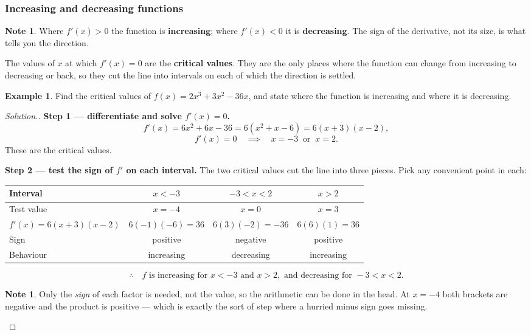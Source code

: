 \documentclass[11pt,a4paper]{article}
\theoremstyle{definition}
\newtheorem{example}[thm]{Example}
\newtheorem{note}[thm]{Note}
\newenvironment{solution}
  {\renewcommand{\qedsymbol}{}\begin{proof}[\textit{Solution}.]}
  {\end{proof}}
\begin{document}
\subsubsection{Increasing and decreasing functions}

\begin{note}
Where $f'(x)>0$ the function is \textbf{increasing}; where $f'(x)<0$ it is
\textbf{decreasing}. The sign of the derivative, not its size, is what tells you the
direction.
\end{note}

The values of $x$ at which $f'(x)=0$ are the \textbf{critical values}. They are the only
places where the function can change from increasing to decreasing or back, so they cut
the line into intervals on each of which the direction is settled.

\begin{example}
Find the critical values of $f(x)=2x^3+3x^2-36x$, and state where the function is
increasing and where it is decreasing.
\end{example}

\begin{solution}
\textbf{Step 1 --- differentiate and solve $f'(x)=0$.}
$$f'(x)=6x^2+6x-36=6\left(x^2+x-6\right)=6(x+3)(x-2),$$
$$f'(x)=0\quad\implies\quad x=-3\ \text{ or }\ x=2.$$
These are the critical values.

\textbf{Step 2 --- test the sign of $f'$ on each interval.} The two critical values cut
the line into three pieces. Pick any convenient point in each:

\begin{table}[H]
\centering
\begin{tabular}{|l|c|c|c|}
\hline
Interval & $x<-3$ & $-3<x<2$ & $x>2$\\
\hline
Test value & $x=-4$ & $x=0$ & $x=3$\\
$f'(x)=6(x+3)(x-2)$ & $6(-1)(-6)=36$ & $6(3)(-2)=-36$ & $6(6)(1)=36$\\
Sign & positive & negative & positive\\
Behaviour & increasing & decreasing & increasing\\
\hline
\end{tabular}
\end{table}

$$\therefore\quad f \text{ is increasing for } x<-3 \text{ and } x>2, \text{ and
decreasing for } -3<x<2.$$

\begin{note}
Only the \emph{sign} of each factor is needed, not the value, so the arithmetic can be
done in the head. At $x=-4$ both brackets are negative and the product is positive ---
which is exactly the sort of step where a hurried minus sign goes missing.
\end{note}
\end{solution}
\end{document}
